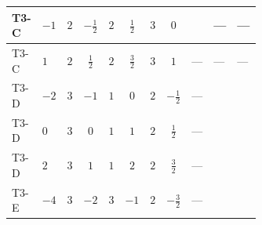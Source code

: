 \documentclass[8pt]{article}
\begin{document}
\begin{landscape}
\begin{longtable}{@{}llcccccc >{\raggedright\arraybackslash}p{0.21\linewidth} >{\raggedright\arraybackslash}p{0.21\linewidth} >{\raggedright\arraybackslash}p{0.21\linewidth}@{}}
\midrule
T3-C & $-1$ & $2$ & $-\frac{1}{2}$ & $2$ & $\frac{1}{2}$ & $3$ & $0$ & \scriptsize\adjustbox{max width=\linewidth}{$\begin{gathered} +24 {\lambda_{11}} \left({\lambda_{11}}\right)^{*}\end{gathered}$} & --- & --- \\
\midrule
T3-C & $1$ & $2$ & $\frac{1}{2}$ & $2$ & $\frac{3}{2}$ & $3$ & $1$ & --- & --- & --- \\
\midrule
T3-D & $-2$ & $3$ & $-1$ & $1$ & $0$ & $2$ & $-\frac{1}{2}$ & --- & \scriptsize\adjustbox{max width=\linewidth}{$\begin{gathered} {\lambda_{S_1}^{(1)}} (4 T_{\nu}^{(1)}+14 {\lambda_{S_1}^{(A)}})\end{gathered}$} & \scriptsize\adjustbox{max width=\linewidth}{$\begin{gathered} +2 {\lambda_{S_1}^{(A)}} T_{\nu}^{(1)}\end{gathered}$} \\
\midrule
T3-D & $0$ & $3$ & $0$ & $1$ & $1$ & $2$ & $\frac{1}{2}$ & --- & \scriptsize\adjustbox{max width=\linewidth}{$\begin{gathered} {\lambda_{S_1}^{(1)}} (4 T_{\nu}^{(1)}+14 {\lambda_{S_1}^{(A)}})\end{gathered}$} & \scriptsize\adjustbox{max width=\linewidth}{$\begin{gathered} +2 {\lambda_{S_1}^{(A)}} T_{\nu}^{(1)}\end{gathered}$} \\
\midrule
T3-D & $2$ & $3$ & $1$ & $1$ & $2$ & $2$ & $\frac{3}{2}$ & --- & \scriptsize\adjustbox{max width=\linewidth}{$\begin{gathered} {\lambda_{S_1}^{(1)}} (4 T_{\nu}^{(1)}+14 {\lambda_{S_1}^{(A)}})\end{gathered}$} & \scriptsize\adjustbox{max width=\linewidth}{$\begin{gathered} +2 {\lambda_{S_1}^{(A)}} T_{\nu}^{(1)}\end{gathered}$} \\
\midrule
T3-E & $-4$ & $3$ & $-2$ & $3$ & $-1$ & $2$ & $-\frac{3}{2}$ & --- & \scriptsize\adjustbox{max width=\linewidth}{$\begin{gathered} {\lambda_{S_1}^{(1)}} (4 T_{\nu}^{(1)}+14 {\lambda_{S_1}^{(A)}})\end{gathered}$} & \scriptsize\adjustbox{max width=\linewidth}{$\begin{gathered} +2 {\lambda_{S_1}^{(A)}} T_{\nu}^{(1)}\end{gathered}$} \\

\end{longtable}
\end{landscape}
\end{document}
